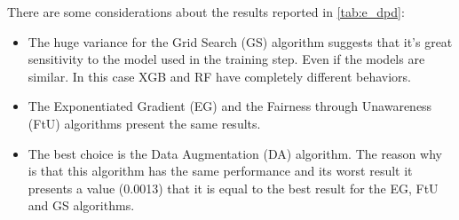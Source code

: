 There are some considerations about the results reported in \cref{tab:e_dpd}:

\begin{itemize}

    \item The huge variance for the Grid Search (GS) algorithm suggests that it's great sensitivity to the model used in the training step. Even if the models are similar. In this case XGB and RF have completely different behaviors.

    \item The Exponentiated Gradient (EG) and the Fairness through Unawareness (FtU) algorithms present the same results.

    \item The best choice is the Data Augmentation (DA) algorithm. The reason why is that this algorithm has the same performance and its worst result it presents a value (0.0013) that it is equal to the best result for the EG, FtU and GS algorithms.
\end{itemize}